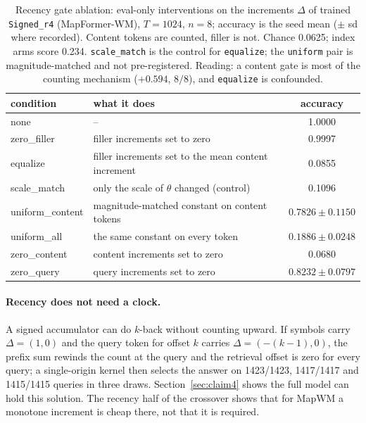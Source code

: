 \documentclass[10pt]{article}
\newcommand{\arm}[1]{\texttt{#1}}
\begin{document}
\begin{table}[t]
\centering
\small
\captionsetup{font=footnotesize,skip=4pt}
\caption{Recency gate ablation: eval-only interventions on the increments $\Delta$ of trained \arm{Signed\_r4} (MapFormer-WM), $T=1024$, $n=8$; accuracy is the seed mean ($\pm$ sd where recorded). Content tokens are counted, filler is not. Chance 0.0625; index arms score 0.234. \texttt{scale\_match} is the control for \texttt{equalize}; the \texttt{uniform} pair is magnitude-matched and not pre-registered. Reading: a content gate is most of the counting mechanism ($+0.594$, $8/8$), and \texttt{equalize} is confounded.}
\label{tab:gate-ablation}
\begin{tabular}{@{}llc@{}}
\toprule
condition & what it does & accuracy \\
\midrule
none & -- & 1.0000 \\
zero\_filler & filler increments set to zero & 0.9997 \\
equalize & filler increments set to the mean content increment & 0.0855 \\
scale\_match & only the scale of $\theta$ changed (control) & 0.1096 \\
uniform\_content & magnitude-matched constant on content tokens & $0.7826\pm0.1150$ \\
uniform\_all & the same constant on every token & $0.1886\pm0.0248$ \\
zero\_content & content increments set to zero & 0.0680 \\
zero\_query & query increments set to zero & $0.8232\pm0.0797$ \\
\bottomrule
\end{tabular}
\end{table}

\paragraph{Recency does not need a clock.} A signed accumulator can do $k$-back without counting upward.
If symbols carry $\Delta=(1,0)$ and the query token for offset $k$ carries $\Delta=(-(k-1),0)$, the prefix
sum rewinds the count at the query and the retrieval offset is zero for every query; a single-origin
kernel then selects the answer on 1423/1423, 1417/1417 and 1415/1415 queries in three draws.
Section~\ref{sec:claim4} shows the full model can hold this solution. The recency half of the crossover
shows that for MapWM a monotone increment is cheap there, not that it is required. %
\end{document}
